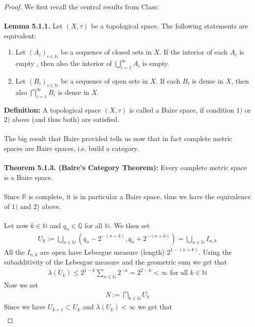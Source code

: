 \documentclass[12pt,a4paper]{article}
\begin{document}
\begin{proof}
We first recall the central results from Class:
\\\\
\textbf{Lemma 5.1.1.} Let $(X, \tau)$ be a topological space. The following statements are equivalent:
\begin{enumerate}
\item Let $(A_i)_{i \in \mathbb{N}}$ be a sequence of closed sets in $X$. If the interior of each $A_i$ is empty , then also the interior of $\bigcup_{i=1}^\infty A_i$ is empty. 
\item Let $(B_i)_{i \in \mathbb{N}}$ be a sequence of open sets in $X$. If each $B_i$ is dense in $X$, then also $\bigcap_{i=1}^\infty B_i$ is dense in $X$. 
\end{enumerate}
\textbf{Definition:} A topological space $(X,  \tau)$ is called a Baire space, if condition $1)$ or $2)$ above (and thus both) are satisfied.\\
\\
The big result that Baire provided tells us now that in fact complete metric spaces are Baire spaces, i.e. build a category.
\\
\\
\textbf{Theorem 5.1.3. (Baire's Category Theorem):} Every complete metric space is a Baire space.
\\\\
Since $\mathbb{R}$ is complete, it is in particular a Baire space, thus we have the equivalence of $1)$ and $2)$ above. 
\\\\
Let now $k \in \mathbb{N}$ and $q_n \in \mathbb{Q}$ for all $\mathbb{N}$. We then set
\begin{align*}
U_k:= \bigcup_{n \in \mathbb{N}} \left(q_n -2^{-(n+k)}, q_n + 2^{-(n+k)}\right) = \bigcup_{n \in \mathbb{N}} I_{n,k}
\end{align*}
All the $I_{n,k}$ are open have Lebesgue measure (length) $2^{1-(n+k)}$. Using the subadditivity of the Lebesgue measure and the geometric sum we get that 
\begin{align*}
\lambda (U_k) \leq 2^{1-k}\sum_{n \in \mathbb{N}} 2^{-n} = 2^{2-k} < \infty \text{ for all } k \in \mathbb{N}
\end{align*}
Now we set
\begin{align*}
N:= \bigcap_{k \in \mathbb{N}} U_k 
\end{align*}
Since we have $U_{k+1} \subset U_k$ and $\lambda(U_k) < \infty$ we get that 
\begin{align*}

\end{align*}
\end{proof}
\end{document}
